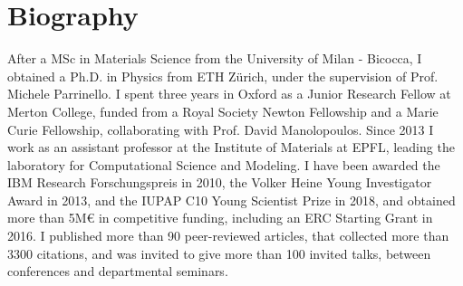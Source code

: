 \section{Biography}
After a MSc in Materials Science from the University of Milan - Bicocca,
I obtained a Ph.D. in Physics from ETH Zürich, under the supervision of
Prof. Michele Parrinello. I spent three years in Oxford as a Junior
Research Fellow at Merton College, funded from a Royal Society Newton
Fellowship and a Marie Curie Fellowship, collaborating with Prof. David
Manolopoulos.
Since 2013 I work as an assistant professor at the Institute of
Materials at EPFL, leading the laboratory for Computational Science and
Modeling.
I have been awarded the IBM Research Forschungspreis in 2010, the Volker
Heine Young Investigator Award in 2013, and the IUPAP C10 Young Scientist
Prize in 2018, and obtained more than 5M€ in competitive funding,
including an ERC Starting Grant in 2016.
I published more than 90 peer-reviewed articles, that collected more than
3300 citations, and was invited to give more than 100 invited talks, between
conferences and departmental seminars.

